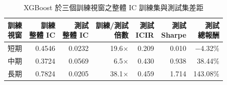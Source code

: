 \begin{table}[H]
\centering
\caption{XGBoost 於三個訓練視窗之整體 IC 訓練集與測試集差距}
\label{tab:results_xgboost_gap}
\begingroup
\scriptsize
\setlength{\tabcolsep}{4pt}
\renewcommand{\arraystretch}{1.10}
\begin{adjustbox}{max width=\textwidth}
\begin{tabular}{@{}lrrrrrr@{}}
\toprule
\makecell[l]{訓練\\視窗} & \makecell[r]{訓練\\整體 IC} & \makecell[r]{測試\\整體 IC} & \makecell[r]{訓練/測試\\倍數} & \makecell[r]{測試\\ICIR} & \makecell[r]{測試\\Sharpe} & \makecell[r]{測試\\總報酬} \\
\midrule
短期 & 0.4546 & 0.0232 & 19.6$\times$ & 0.209 & 0.010 & $-$4.32\% \\
中期 & 0.3724 & 0.0569 & 6.5$\times$ & 0.430 & 0.938 & 38.44\% \\
長期 & 0.7824 & 0.0205 & 38.1$\times$ & 0.459 & 1.714 & 143.08\% \\
\bottomrule
\end{tabular}
\end{adjustbox}
\endgroup
\end{table}
